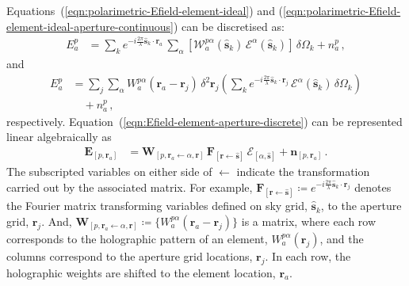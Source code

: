 \documentclass[
  journal=pasa,
  manuscript=article-type,
  year=2020,
  volume=37,
]{cup-journal}
\begin{document}
Equations~(\ref{eqn:polarimetric-Efield-element-ideal}) and (\ref{eqn:polarimetric-Efield-element-ideal-aperture-continuous}) can be discretised as:
\begin{align}
    E_{a}^p &= \sum_k e^{-i\frac{2\pi}{\lambda}\hat{\boldsymbol{s}}_k\cdot\boldsymbol{r}_{a}} \, \sum_\alpha \left[\mathcal{W}_{a}^{p\alpha}(\hat{\boldsymbol{s}}_k) \, \mathcal{E}^\alpha(\hat{\boldsymbol{s}}_k)\right] \, \delta\Omega_k + n_{a}^p \, , \label{eqn:Efield-element-img-discrete}
\end{align}
and
\begin{align}
    E_{a}^p &= \sum_j \sum_\alpha W_{a}^{p\alpha}(\boldsymbol{r}_{a}-\boldsymbol{r}_j)\, \delta^2\boldsymbol{r}_j \left(\sum_k e^{-i\frac{2\pi}{\lambda} \hat{\boldsymbol{s}}_k\cdot\boldsymbol{r}_j} \, \mathcal{E}^\alpha(\hat{\boldsymbol{s}}_k) \,\delta\Omega_k \right) \nonumber\\ 
    &\quad + n_{a}^p \, , \label{eqn:Efield-element-aperture-discrete}    
\end{align}
respectively. Equation~(\ref{eqn:Efield-element-aperture-discrete}) can be represented linear algebraically as
\begin{align}
    \mathbf{E}_{[p,\boldsymbol{r}_{a}]} &= \mathbf{W}_{[p,\boldsymbol{r}_{a}\leftarrow \alpha,\boldsymbol{r}]} \, \mathbf{F}_{[\boldsymbol{r}\leftarrow \hat{\boldsymbol{s}}]} \, \boldsymbol{\mathcal{E}}_{[\alpha,\hat{\boldsymbol{s}}]} + \mathbf{n}_{[p,\boldsymbol{r}_{a}]} \, .
\end{align}
The subscripted variables on either side of $\leftarrow$ indicate the transformation carried out by the associated matrix. For example, $\mathbf{F}_{[\boldsymbol{r}\leftarrow \hat{\boldsymbol{s}}]}\coloneqq e^{-i\frac{2\pi}{\lambda} \hat{\boldsymbol{s}}_k\cdot\boldsymbol{r}_j}$ denotes the Fourier matrix transforming variables defined on sky grid, $\hat{\boldsymbol{s}}_k$, to the aperture grid, $\boldsymbol{r}_j$. And, $\mathbf{W}_{[p,\boldsymbol{r}_{a}\leftarrow \alpha,\boldsymbol{r}]}\coloneqq \{W_{a}^{p\alpha}(\boldsymbol{r}_{a}-\boldsymbol{r}_j)\}$ is a matrix, where each row corresponds to the holographic pattern of an element, $W_{a}^{p\alpha}(\boldsymbol{r}_j)$, and the columns correspond to the aperture grid locations, $\boldsymbol{r}_j$. In each row, the holographic weights are shifted to the element location, $\boldsymbol{r}_{a}$. 
\end{document}
